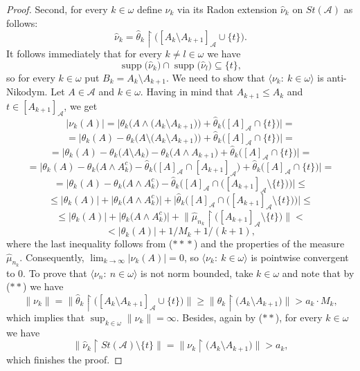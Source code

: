 \documentclass[10pt,a4paper]{amsart}
\newcommand{\N}{\mathbb{N}}
\newcommand{\aA}{\mathcal{A}}
\newcommand{\clopen}[1]{\left[#1\right]}
\newcommand{\iA}{\in\aA}
\newcommand{\io}{\in\omega}%
\newcommand{\rstr}{\restriction}
\newcommand{\seqk}[1]{\big\langle#1\colon\ k\io\big\rangle}
\newcommand{\seqn}[1]{\big\langle#1\colon\ n\io\big\rangle}
\newcommand{\sm}{\setminus}
\newcommand{\sub}{\subseteq}
\DeclareMathOperator{\supp}{supp}
\newcommand{\wh}{\widehat}
\begin{document}
\begin{proof}
Second, for every $k\io$ define $\nu_k$ via its Radon extension $\wh{\nu}_k$ on $St(\aA)$ as follows:
\[\wh{\nu}_k=\wh{\theta}_k\rstr\big(\clopen{A_k\sm A_{k+1}}_\aA\cup\{t\}\big).\]
It follows immediately that for every $k\neq l\io$ we have
\[\supp\big(\wh{\nu}_k\big)\cap\supp\big(\wh{\nu}_l\big)\sub\{t\},\]
so for every $k\io$ put $B_k=A_k\sm A_{k+1}$. We need to show that $\seqk{\nu_k}$ is anti-Nikodym. Let $A\iA$ and $k\io$. Having in mind that $A_{k+1}\le A_k$ and $t\in\clopen{A_{k+1}}_\aA$, we get
\[\big|\nu_k(A)\big|=\big|\theta_k\big(A\wedge \big(A_k\sm A_{k+1}\big)\big)+\wh{\theta}_k\big(\clopen{A}_\aA\cap\{t\}\big)\big|=\]
\[=\big|\theta_k(A)-\theta_k\big(A\sm\big(A_k\sm A_{k+1}\big)\big)+\wh{\theta}_k\big(\clopen{A}_\aA\cap\{t\}\big)\big|=\]
\[=\big|\theta_k(A)-\theta_k\big(A\sm A_k\big)-\theta_k\big(A\wedge A_{k+1}\big)+\wh{\theta}_k\big(\clopen{A}_\aA\cap\{t\}\big)\big|=\]
\[=\big|\theta_k(A)-\theta_k\big(A\wedge A_k^c\big)-\wh{\theta}_k\big(\clopen{A}_\aA\cap \clopen{A_{k+1}}_\aA\big)+\wh{\theta}_k\big(\clopen{A}_\aA\cap\{t\}\big)\big|=\]
\[=\big|\theta_k(A)-\theta_k\big(A\wedge A_k^c\big)-\wh{\theta}_k\Big(\clopen{A}_\aA\cap\big(\clopen{A_{k+1}}_\aA\sm\{t\}\big)\Big)\big|\le\]
\[\le\big|\theta_k(A)\big|+\big|\theta_k\big(A\wedge A_k^c\big)\big|+\big|\wh{\theta}_k\Big(\clopen{A}_\aA\cap\big(\clopen{A_{k+1}}_\aA\sm\{t\}\big)\Big)\big|\le\]
\[\le\big|\theta_k(A)\big|+\big|\theta_k\big(A\wedge A_k^c\big)\big|+\big\|\wh{\mu}_{n_k}\rstr\big(\clopen{A_{k+1}}_\aA\sm\{t\}\big)\big\|<\]
\[<\big|\theta_k(A)\big|+1/{M_k}+1/(k+1),\]
where the last inequality follows from ($*\!*\!*$) and the properties of the measure $\wh{\mu}_{n_k}$. Consequently, $\lim_{k\to\infty}\big|\nu_k(A)\big|=0$,
so $\seqk{\nu_k}$ is pointwise convergent to $0$. To prove that $\seqn{\nu_n}$ is not norm bounded, take $k\io$ and note that by ($**$) we have
\[\big\|\nu_k\big\|=\big\|\wh{\theta}_k\rstr\big(\clopen{A_k\sm A_{k+1}}_\aA\cup\{t\}\big)\big\|\ge\big\|\theta_k\rstr\big(A_k\sm A_{k+1}\big)\big\|>a_k\cdot M_k,\]
which implies that $\sup_{k\io}\big\|\nu_k\big\|=\infty$. Besides, again by ($**$), for every $k\io$ we have
\[\big\|\wh{\nu}_k\rstr St(\aA)\sm\{t\}\big\|=\big\|\nu_k\rstr\big(A_k\sm A_{k+1}\big)\big\|>a_k,\]
which finishes the proof.
\end{proof}
\end{document}
